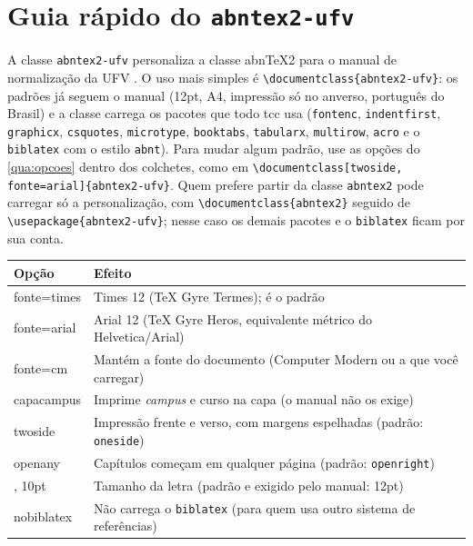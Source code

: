 
\chapter{Guia rápido do \texttt{abntex2-ufv}}\label{ap:classe}

A classe \texttt{abntex2-ufv} personaliza a classe abn\TeX2 \cite{abntex2classe} para o
manual de normalização da UFV \cite{manualUFV}. O uso mais simples é
\texttt{\textbackslash documentclass\{abntex2-ufv\}}: os padrões já seguem o manual (12pt,
A4, impressão só no anverso, português do Brasil) e a classe carrega os pacotes que todo
\ac{tcc} usa (\texttt{fontenc}, \texttt{indentfirst}, \texttt{graphicx}, \texttt{csquotes},
\texttt{microtype}, \texttt{booktabs}, \texttt{tabularx}, \texttt{multirow}, \texttt{acro} e o
\texttt{biblatex} com o estilo \texttt{abnt}). Para mudar algum padrão, use as opções do
\autoref{qua:opcoes} dentro dos colchetes, como em
\texttt{\textbackslash documentclass[twoside, fonte=arial]\{abntex2-ufv\}}.
Quem prefere partir da classe \texttt{abntex2} pode carregar só a personalização, com
\texttt{\textbackslash documentclass\{abntex2\}} seguido de
\texttt{\textbackslash usepackage\{abntex2-ufv\}}; nesse caso os demais pacotes e o
\texttt{biblatex} ficam por sua conta.

\begin{quadro}[htbp]
\begin{ilustracao}{\caption[Opções da classe abntex2-ufv]{Opções da classe \texttt{abntex2-ufv}}\label{qua:opcoes}}{\elaboracaopropria}
  \renewcommand{\arraystretch}{1.2}
  \small
  \begin{tabularx}{\textwidth}{|>{\ttfamily\raggedright\arraybackslash}p{3.4cm}|X|}
    \hline
    \textnormal{\textbf{Opção}} & \textbf{Efeito} \\
    \hline
    fonte=times & Times 12 (TeX Gyre Termes); é o padrão \\
    \hline
    fonte=arial & Arial 12 (TeX Gyre Heros, equivalente métrico do Helvetica/Arial) \\
    \hline
    fonte=cm & Mantém a fonte do documento (Computer Modern ou a que você carregar) \\
    \hline
    capacampus & Imprime \emph{campus} e curso na capa (o manual não os exige) \\
    \hline
    twoside & Impressão frente e verso, com margens espelhadas (padrão: \texttt{oneside}) \\
    \hline
    openany & Capítulos começam em qualquer página (padrão: \texttt{openright}) \\
    \hline
    11pt, 10pt & Tamanho da letra (padrão e exigido pelo manual: 12pt) \\
    \hline
    nobiblatex & Não carrega o \texttt{biblatex} (para quem usa outro sistema de referências) \\
    \hline
  \end{tabularx}
\end{ilustracao}
\end{quadro}

